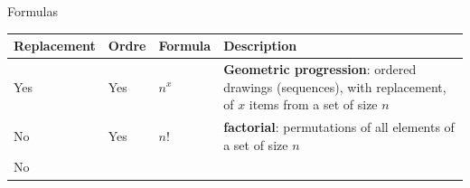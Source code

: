 \documentclass[ignorenonframetext,]{beamer}
\begin{document}
\begin{frame}{Formulas}
\protect\hypertarget{formulas}{}

\begin{longtable}[]{@{}llll@{}}
\toprule
\begin{minipage}[b]{0.12\columnwidth}\raggedright
Replacement\strut
\end{minipage} & \begin{minipage}[b]{0.10\columnwidth}\raggedright
Ordre\strut
\end{minipage} & \begin{minipage}[b]{0.18\columnwidth}\raggedright
Formula\strut
\end{minipage} & \begin{minipage}[b]{0.49\columnwidth}\raggedright
Description\strut
\end{minipage}\tabularnewline
\midrule
\endhead
\begin{minipage}[t]{0.12\columnwidth}\raggedright
Yes\strut
\end{minipage} & \begin{minipage}[t]{0.10\columnwidth}\raggedright
Yes\strut
\end{minipage} & \begin{minipage}[t]{0.18\columnwidth}\raggedright
\(n^x\)\strut
\end{minipage} & \begin{minipage}[t]{0.49\columnwidth}\raggedright
\textbf{Geometric progression}: ordered drawings (sequences), with
replacement, of \(x\) items from a set of size \(n\)\strut
\end{minipage}\tabularnewline
\begin{minipage}[t]{0.12\columnwidth}\raggedright
No\strut
\end{minipage} & \begin{minipage}[t]{0.10\columnwidth}\raggedright
Yes\strut
\end{minipage} & \begin{minipage}[t]{0.18\columnwidth}\raggedright
\(n!\)\strut
\end{minipage} & \begin{minipage}[t]{0.49\columnwidth}\raggedright
\textbf{factorial}: permutations of all elements of a set of size
\(n\)\strut
\end{minipage}\tabularnewline
\begin{minipage}[t]{0.12\columnwidth}\raggedright
No\strut
\end{minipage} & \begin{minipage}[t]{0.10\columnwidth}\raggedright

\end{minipage}
\end{longtable}
\end{frame}
\end{document}
